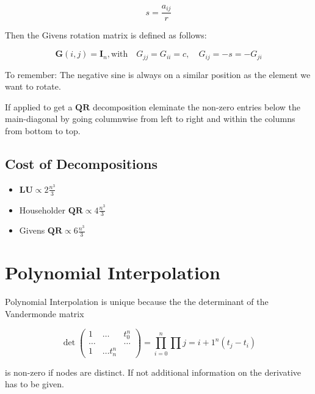 \documentclass[
    a4paper,
    11pt
]{article}
\begin{document}
\begin{equation}
    s = \frac{a_{ij}}{r}
\end{equation}

Then the Givens rotation matrix is defined as follows:

\begin{equation}
    \mathbf{G}(i, j) = \mathbf{I}_n, \text{with} \quad
    G_{jj} = G_{ii} = c, \quad G_{ij} = -s = -G_{ji}
\end{equation}

To remember: The negative sine is always on a similar position as the element we
want to rotate.


If applied to get a $\mathbf{QR}$ decomposition eleminate the non-zero entries
below the main-diagonal by going columnwise from left to right and within the
columns from bottom to top.

\subsection{Cost of Decompositions}

\begin{itemize}
    \item $\mathbf{LU} \propto 2\frac{n^3}{3}$
    \item Householder $\mathbf{QR} \propto 4\frac{n^3}{3}$
    \item Givens $\mathbf{QR} \propto 6\frac{n^3}{3}$

\end{itemize}

\section{Polynomial Interpolation}

Polynomial Interpolation is unique because the the determinant of the
Vandermonde matrix

\begin{equation}
    \det \begin{pmatrix}
        1 & \dots & t_0^n \\
        \hdots & & \hdots \\
        1 & \dots t_n^n
        \end{pmatrix}
    =
    \prod_{i=0}^n \prod{j=i+1}^n (t_j -t_i)
\end{equation}

is non-zero if nodes are distinct. If not additional information on the
derivative has to be given.
\end{document}
